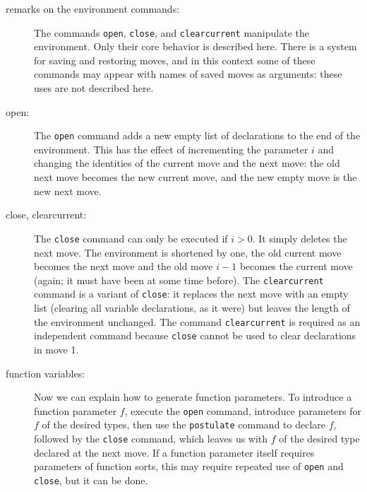 \documentclass[12pt]{article}
\begin{document}
\begin{description}
\item[remarks on the environment commands:]  The commands {\tt open}, {\tt close}, and {\tt clearcurrent} manipulate the environment.  Only their core behavior is described here.   There is a system for saving and restoring moves, and in this context some of these commands may appear with names of saved moves as arguments:  these uses are not described here.

\item[open:]  The {\tt open} command adds a new empty list of declarations to the end of the environment.  This has the effect of incrementing the parameter $i$
and changing the identities of the current move and the next move:  the old next move becomes the new current move, and the new empty move is the new next move.

\item[close, clearcurrent:]  The {\tt close} command can only be executed if $i>0$.  It simply deletes the next move.  The environment is shortened by one, the old current move becomes the next move and the old move $i-1$ becomes the current move (again;  it must have been at some time before).  The {\tt clearcurrent} command is a variant of {\tt close}:  it replaces the next move with an empty list (clearing all variable declarations, as it were) but leaves the length of the environment unchanged.  The command {\tt clearcurrent} is required as an independent command because {\tt close} cannot be used to clear declarations  in move 1.

\item[function variables:]  Now we can explain how to generate function parameters.   To introduce a function parameter $f$, execute the {\tt open} command, introduce parameters for $f$ of the desired types, then use the {\tt postulate} command to declare $f$, followed by the {\tt close} command, which leaves us with $f$ of the desired type declared at the next move.  If a function parameter itself requires parameters of function sorts, this may require repeated use of {\tt open} and  {\tt close}, but it can be done.


\end{description}
\end{document}
